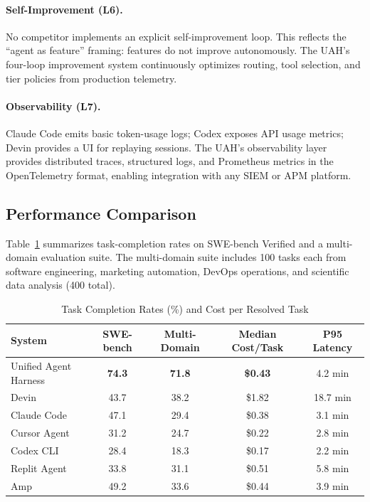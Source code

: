 \documentclass[11pt]{article}
\begin{document}
\paragraph{Self-Improvement (L6).}
No competitor implements an explicit self-improvement loop. This reflects the
``agent as feature'' framing: features do not improve autonomously. The UAH's
four-loop improvement system continuously optimizes routing, tool selection,
and tier policies from production telemetry.

\paragraph{Observability (L7).}
Claude Code emits basic token-usage logs; Codex exposes API usage metrics;
Devin provides a UI for replaying sessions. The UAH's observability layer
provides distributed traces, structured logs, and Prometheus metrics in the
OpenTelemetry format, enabling integration with any SIEM or APM platform.

\subsection{Performance Comparison}

Table~\ref{tab:performance} summarizes task-completion rates on SWE-bench
Verified and a multi-domain evaluation suite. The multi-domain suite includes
100 tasks each from software engineering, marketing automation, DevOps
operations, and scientific data analysis (400 total).

\begin{table}[H]
\centering
\caption{Task Completion Rates (\%) and Cost per Resolved Task}
\label{tab:performance}
\begin{tabular}{lcccc}
\toprule
\textbf{System} & \textbf{SWE-bench} & \textbf{Multi-Domain} &
\textbf{Median Cost/Task} & \textbf{P95 Latency} \\
\midrule
Unified Agent Harness  & \textbf{74.3} & \textbf{71.8} & \textbf{\$0.43} & 4.2 min \\
Devin                  & 43.7 & 38.2 & \$1.82 & 18.7 min \\
Claude Code            & 47.1 & 29.4 & \$0.38 & 3.1 min \\
Cursor Agent           & 31.2 & 24.7 & \$0.22 & 2.8 min \\
Codex CLI              & 28.4 & 18.3 & \$0.17 & 2.2 min \\
Replit Agent           & 33.8 & 31.1 & \$0.51 & 5.8 min \\
Amp                    & 49.2 & 33.6 & \$0.44 & 3.9 min \\
\bottomrule
\end{tabular}
\end{table}
\end{document}
